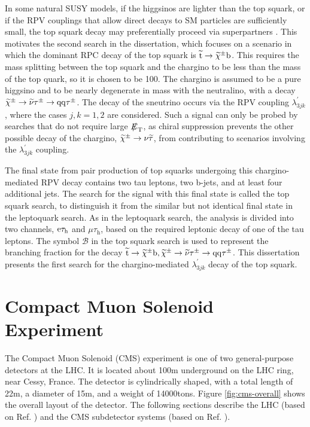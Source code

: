 \documentclass[12pt]{thesis}  %
\newcommand{\tauh}{\ensuremath{\tau_{\text{h}}}\xspace}
\newcommand{\Pe}{\ensuremath{\cmsSymbolFace{e}}\xspace}
\newcommand{\mutau}{\ensuremath{\mu\tauh}\xspace}
\newcommand{\etau}{\ensuremath{\Pe\tauh}\xspace}
\def\eslash{\ensuremath{{\hbox{$E$\kern-0.6em\lower-.05ex\hbox{/}\kern0.10em}}}}
\def\met{\mbox{$\eslash_\text{T}$}\xspace} %
\begin{document}
In some natural SUSY models, if the higgsinos are lighter than the top squark, or if the RPV couplings that allow direct decays to SM particles are sufficiently small, the top squark decay may preferentially proceed via superpartners \cite{Jared}. This motivates the second search in the dissertation, which focuses on a scenario in which the dominant RPC decay of the top squark is $\widetilde{\mathrm{t}} \rightarrow \widetilde{\chi}^{\pm}\mathrm{b}$. This requires the mass splitting between the top squark and the chargino to be less than the mass of the top quark, so it is chosen to be 100\GeV. The chargino is assumed to be a pure higgsino and to be nearly degenerate in mass with the neutralino, with a decay $\widetilde{\chi}^{\pm} \rightarrow \widetilde{\nu}\tau^{\pm} \rightarrow \mathrm{q}\mathrm{q}\tau^{\pm}$. The decay of the sneutrino occurs via the RPV coupling $\lambda_{3jk}^{\prime}$, where the cases $j, k = 1, 2$ are considered. Such a signal can only be probed by searches that do not require large \met, as chiral suppression prevents the other possible decay of the chargino, $\widetilde{\chi}^{\pm}\to\nu\widetilde{\tau}$, from contributing to scenarios involving the $\lambda_{3jk}^{\prime}$ coupling.

The final state from pair production of top squarks undergoing this chargino-mediated RPV decay contains two tau leptons, two b-jets, and at least four additional jets. The search for the signal with this final state is called the top squark search, to distinguish it from the similar but not identical final state in the leptoquark search. As in the leptoquark search, the analysis is divided into two channels, \etau and \mutau, based on the required leptonic decay of one of the tau leptons. The symbol $\mathcal{B}$ in the top squark search is used to represent the branching fraction for the decay $\widetilde{\mathrm{t}} \rightarrow \widetilde{\chi}^{\pm}\mathrm{b}, \widetilde{\chi}^{\pm} \rightarrow \widetilde{\nu}\tau^{\pm} \rightarrow \mathrm{q}\mathrm{q}\tau^{\pm}$.  This dissertation presents the first search for the chargino-mediated $\lambda_{3jk}^{\prime}$ decay of the top squark.

\chapter{Compact Muon Solenoid Experiment
\label{ch:cmsexperiment}}

The Compact Muon Solenoid (CMS) experiment is one of two general-purpose detectors at the LHC. It is located about 100\unit{m} underground on the LHC ring, near Cessy, France. The detector is cylindrically shaped, with a total length of 22\unit{m}, a diameter of 15\unit{m}, and a weight of 14000\unit{tons}. Figure \ref{fig:cms-overall} shows the overall layout of the detector. The following sections describe the LHC (based on Ref. \cite{LHCmachine}) and the CMS subdetector systems (based on Ref. \cite{CMSJINST}).
\end{document}
